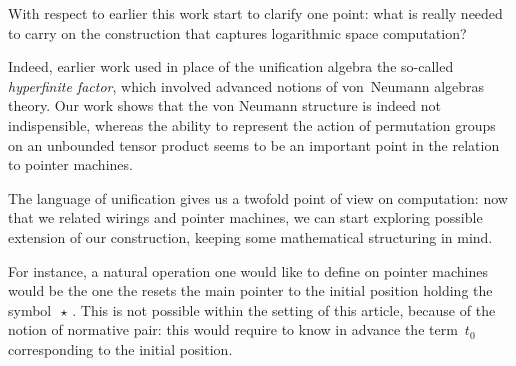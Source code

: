 With respect to earlier \cite{girard_normativity_2012,aubert_characterizing_2012,seiller_logarithmic_2013} this work start to clarify one point: what is really needed to carry on the construction that captures logarithmic space computation?

Indeed, earlier work used in place of the unification algebra the so-called \emph{hyperfinite factor}, which involved advanced notions of von~Neumann algebras theory. Our work shows that the von Neumann structure is indeed not indispensible, whereas the ability to represent the action of permutation groups on an unbounded tensor product seems to be an important point in the relation to pointer machines.

\smallskip
The language of unification gives us a twofold point of view on computation: now that we related wirings and pointer machines, we can start exploring possible extension of our construction, keeping some mathematical structuring in mind.

For instance, a natural operation one would like to define on pointer machines would be the one the resets the main pointer to the initial position holding the symbol $\,\star\,$. This is not possible within the setting of this article, because of the notion of normative pair: this would require to know in advance the term $\,t_0\,$ corresponding to the initial position.


